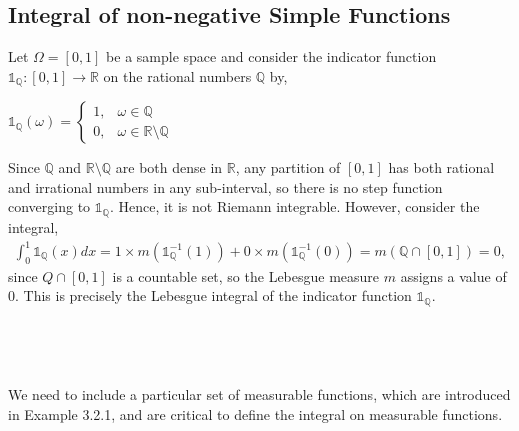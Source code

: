 \documentclass{article}
\begin{document}
\subsection{Integral of non-negative Simple Functions}
Let $\Omega=[0,1]$ be a sample space and consider the indicator function $\mathds{1}_{\mathbb{Q}}: [0,1] \to \mathbb{R}$ on the rational numbers $\mathbb{Q}$ by,
\begin{center}
$\mathds{1}_{\mathbb{Q}}(\omega) =
\begin{cases}
1, & \omega \in \mathbb{Q}\\
0, & \omega \in \mathbb{R}\setminus\mathbb{Q}
\end{cases}$
\end{center}
Since $\mathbb{Q}$ and $\mathbb{R}\setminus\mathbb{Q}$ are both dense in $\mathbb{R}$, any partition of $[0,1]$ has both rational and irrational numbers in any sub-interval, so there is no step function converging to $\mathds{1}_{\mathbb{Q}}$. Hence, it is not Riemann integrable. However, consider the integral,
\begin{eqnarray}
\nonumber
\int_{0}^{1}\mathds{1}_{\mathbb{Q}}(x)dx = 1 \times m(\mathds{1}_{\mathbb{Q}}^{-1}(1)) + 0 \times m(\mathds{1}_{\mathbb{Q}}^{-1}(0)) = m(\mathbb{Q}\cap[0,1]) = 0,
\end{eqnarray}
since $Q\cap[0,1]$ is a countable set, so the Lebesgue measure $m$ assigns a value of $0$. This is precisely the Lebesgue integral of the indicator function $\mathds{1}_{\mathbb{Q}}$. \\\\
\noindent{}\\\\\\
We need to include a particular set of measurable functions, which are introduced in Example 3.2.1, and are critical to define the integral on measurable functions.\\\\
\end{document}
